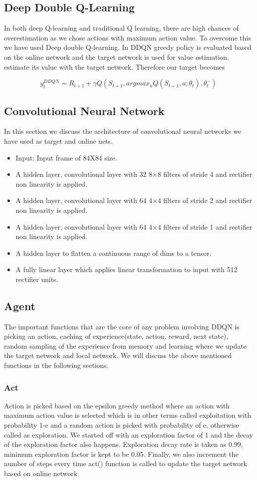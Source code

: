 \documentclass[conference]{IEEEtran}
\theoremstyle{definition}
\begin{document}
\subsection{Deep Double Q-Learning}
In both deep Q-learning and traditional Q learning, there are high chances of overestimation as we chose actions with maximum action value. To overcome this we have used Deep double Q-learning. In DDQN greedy policy is evaluated based on the online network and the target network is used for value estimation. estimate its value with the target network. Therefore our target becomes

\[ y_t^{DDQN} = R_{t+1} + \gamma Q(S_{t+1}, argmax_aQ(S_{t+1},a;\theta_t),\theta_t^{-})\]

\subsection{Convolutional Neural Network}
In this section we discuss the architecture of convolutional neural networks we have used as target and online nets.
\begin{itemize}
  \item Input: Input frame of 84X84 size.
  \item A hidden layer, convolutional layer with 32 8×8 filters of stride 4 and rectifier non linearity is applied.
  \item A hidden layer, convolutional layer with 64 4×4 filters of stride 2 and rectifier non linearity is applied.
  \item A hidden layer, convolutional layer with 64 4×4 filters of stride 1 and rectifier non linearity is applied.
  \item A hidden layer to flatten a continuous range of dims to a tensor.
  \item A fully linear layer which applies linear transformation to input with 512 rectifier units.
\end{itemize}
\subsection{Agent}
The important functions that are the core of any problem involving DDQN is picking an action, caching of experience(state, action, reward, next state), random sampling of the experience from memory and learning where we update the target network and local network. We will discuss the above mentioned functions in the following sections.
\\
\subsubsection{Act}
Action is picked based on the epsilon greedy method where an action with maximum action value is selected which is in other terms called exploitation with probability 1-e and a random action is picked with probability of e, otherwise called as exploration. We started off with an exploration factor of 1 and the decay of the exploration factor also happens. Exploration decay rate is taken as 0.99, minimum exploration factor is kept to be 0.05. Finally, we also increment the number of steps every time act() function is called to update the target network based on online network
\\
\end{document}
